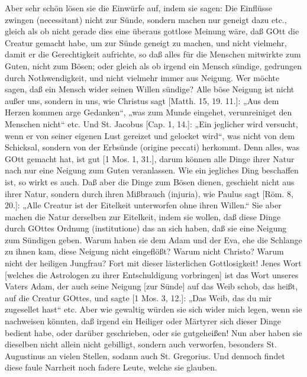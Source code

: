 Aber sehr schön lösen sie die Einwürfe auf, indem sie sagen: Die Einflüsse zwingen (necessitant) nicht zur Sünde, sondern machen nur geneigt dazu etc., gleich als ob nicht gerade dies eine überaus gottlose Meinung wäre, daß GOtt die Creatur gemacht habe, um zur Sünde geneigt zu machen, und nicht vielmehr, damit er die Gerechtigkeit aufrichte, so daß alles für die Menschen mitwirkte zum Guten, nicht zum Bösen; oder gleich als ob irgend ein Mensch sündige, gedrungen durch Nothwendigkeit, und nicht vielmehr immer aus Neigung. Wer möchte sagen, daß ein Mensch wider seinen Willen sündige? Alle böse Neigung ist nicht außer uns,
sondern in uns, wie Christus sagt [Matth. 15, 19. 11.]: „Aus dem Herzen kommen arge Gedanken“, „was zum Munde eingehet, verunreiniget den Menschen nicht“ etc. Und St. Jacobus [Cap. 1, 14.]: „Ein jeglicher wird versucht, wenn er von seiner eigenen Lust gereizet und gelocket wird“, was nicht von dem Schicksal, sondern von der Erbsünde (origine peccati) herkommt. Denn alles, was GOtt gemacht hat, ist gut [1 Mos. 1, 31.], darum können alle Dinge ihrer Natur nach nur eine Neigung zum Guten veranlassen. Wie ein jegliches Ding beschaffen ist, so wirkt es auch. Daß aber die Dinge zum Bösen dienen, geschieht nicht aus ihrer Natur, sondern durch ihren Mißbrauch (injuria), wie Paulus sagt [Röm. 8, 20.]: „Alle Creatur ist der Eitelkeit unterworfen ohne ihren Willen.“ Sie aber machen die Natur derselben zur Eitelkeit, indem sie wollen, daß diese Dinge durch GOttes Ordnung (institutione) das an sich haben, daß sie eine Neigung zum Sündigen geben. Warum haben sie dem Adam und der Eva, ehe die Schlange zu ihnen kam, diese Neigung nicht eingeflößt? Warum nicht Christo? Warum nicht der heiligen Jungfrau? Fort mit dieser lästerlichen Gottlosigkeit! Jenes Wort [welches die Astrologen zu ihrer Entschuldigung vorbringen] ist das Wort unseres Vaters Adam, der auch seine Neigung [zur Sünde] auf das Weib schob, das heißt, auf die Creatur GOttes, und sagte [1 Mos. 3, 12.]: „Das Weib, das du mir zugesellet hast“ etc. Aber wie gewaltig würden sie sich wider mich legen, wenn sie nachweisen könnten, daß irgend ein Heiliger oder Märtyrer sich dieser Dinge bedient habe, oder darüber geschrieben, oder sie gutgeheißen! Nun aber haben sie dieselben nicht allein nicht gebilligt, sondern auch verworfen, besonders St. Augustinus an vielen Stellen, sodann auch St. Gregorius. Und dennoch findet diese faule Narrheit noch fadere Leute, welche sie glauben.


